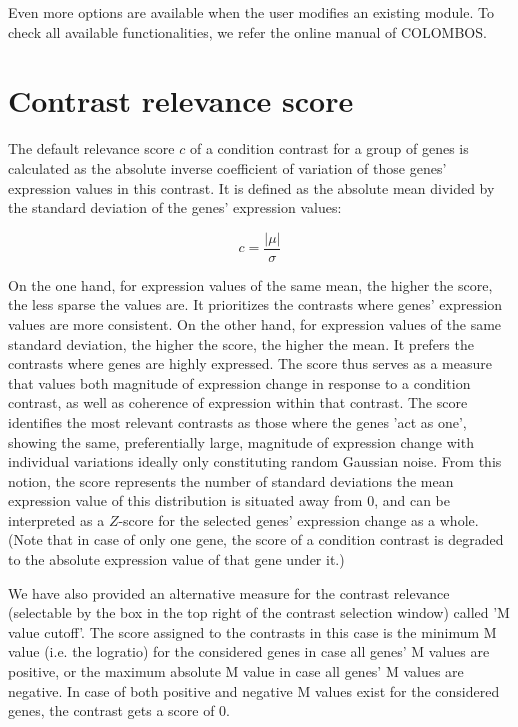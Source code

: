Even more options are available when the user modifies an existing 
module. To check all available functionalities, we refer the online manual of 
COLOMBOS.



\section{Contrast relevance score}\label{apd:contrast-score}

The default relevance score $c$ of a condition contrast for a group
of genes is calculated as the absolute inverse coefficient of
variation of those genes’ expression values in this contrast. It
is defined as the absolute mean divided by the standard deviation
of the genes’ expression values:

\begin{equation}
c=\frac{|\mu|}{\sigma}
\end{equation}
 
On the one hand, for expression values of the same mean, the
higher the score, the less sparse the values are. It prioritizes
the contrasts where genes’ expression values are more
consistent. On the other hand, for expression values of the same
standard deviation, the higher the score, the higher the mean. It
prefers the contrasts where genes are highly expressed. The score
thus serves as a measure that values both magnitude of expression
change in response to a condition contrast, as well as coherence
of expression within that contrast. The score identifies the most
relevant contrasts as those where the genes 'act as one', showing
the same, preferentially large, magnitude of expression change
with individual variations ideally only constituting random
Gaussian noise. From this notion, the score represents the number
of standard deviations the mean expression value of this
distribution is situated away from $0$, and can be interpreted as a
$Z$-score for the selected genes' expression change as a
whole. (Note that in case of only one gene, the score of a
condition contrast is degraded to the absolute expression value
of that gene under it.)

We have also provided an alternative measure for the contrast
relevance (selectable by the box in the top right of the contrast
selection window) called 'M value cutoff'.  The score assigned to
the contrasts in this case is the minimum M value (i.e. the
logratio) for the considered genes in case all genes' M values
are positive, or the maximum absolute M value in case all genes'
M values are negative.  In case of both positive and negative M
values exist for the considered genes, the contrast gets a score
of 0.



